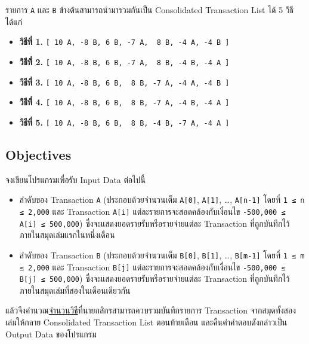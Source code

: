 \noindent
รายการ \lstinline{A} และ \lstinline{B} ข้างต้นสามารถนำมารวมกันเป็น Consolidated Transaction List ได้ 5 วิธี ได้แก่

\begin{itemize}[leftmargin=2pc,topsep=0.25pc] 
    \item[] \textbf{วิธีที่ 1.}\;\; \lstinline{[ 10 A, -8 B, 6 B, -7 A,  8 B, -4 A, -4 B ]}
    \item[] \textbf{วิธีที่ 2.}\;\; \lstinline{[ 10 A, -8 B, 6 B, -7 A,  8 B, -4 B, -4 A ]}
    \item[] \textbf{วิธีที่ 3.}\;\; \lstinline{[ 10 A, -8 B, 6 B,  8 B, -7 A, -4 A, -4 B ]}
    \item[] \textbf{วิธีที่ 4.}\;\; \lstinline{[ 10 A, -8 B, 6 B,  8 B, -7 A, -4 B, -4 A ]}
    \item[] \textbf{วิธีที่ 5.}\;\; \lstinline{[ 10 A, -8 B, 6 B,  8 B, -4 B, -7 A, -4 A ]}
\end{itemize}


\newpage
{}
\subsection{Objectives}

\noindent
จงเขียนโปรแกรมเพื่อรับ Input Data ต่อไปนี้

\begin{itemize}[topsep=0pc,itemsep=0pt]
    \item 
        ลำดับของ Transaction \lstinline{A}\:
        (ประกอบด้วยจำนวนเต็ม \lstinline{A[0]}, \lstinline{A[1]}, \ldots, \lstinline{A[n-1]} โดยที่ \lstinline{1 ≤ n ≤ 2,000} และ Transaction \lstinline{A[i]} แต่ละรายการจะสอดคล้องกับเงื่อนไข \lstinline{-500,000 ≤ A[i] ≤ 500,000}) \;
        ซึ่งจะแสดงยอดรายรับหรือรายจ่ายแต่ละ Transaction ที่ถูกบันทึกไว้ภายในสมุดเล่มแรกในหนึ่งเดือน
    \item 
        ลำดับของ Transaction \lstinline{B}\:
        (ประกอบด้วยจำนวนเต็ม \lstinline{B[0]}, \lstinline{B[1]}, \ldots, \lstinline{B[m-1]} โดยที่ \lstinline{1 ≤ m ≤ 2,000} และ Transaction \lstinline{B[j]} แต่ละรายการจะสอดคล้องกับเงื่อนไข \lstinline{-500,000 ≤ B[j] ≤ 500,000}) \;
        ซึ่งจะแสดงยอดรายรับหรือรายจ่ายแต่ละ Transaction ที่ถูกบันทึกไว้ภายในสมุดเล่มที่สองในเดือนเดียวกัน
\end{itemize}

\noindent
แล้วจึงคำนวณ\uline{จำนวนวิธี}ที่นายกสิกรสามารถควบรวมบันทึกรายการ Transaction จากสมุดทั้งสองเล่มให้กลาย Consolidated Transaction List ตอนท้ายเดือน และคืนค่าคำตอบดังกล่าวเป็น Output Data ของโปรแกรม

